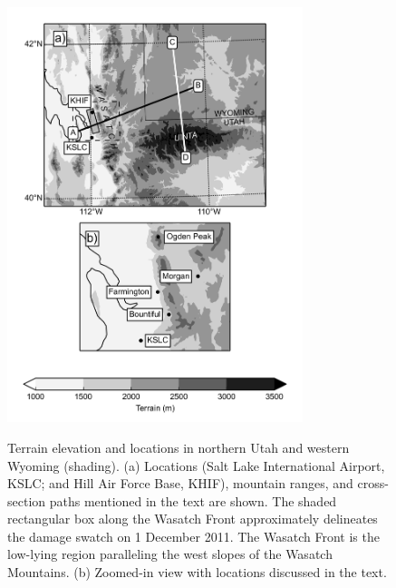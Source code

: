 \documentclass[pdftex,12pt]{article}
\begin{document}
\begin{figure}[t]
\centering
\noindent\includegraphics[width=0.77\textwidth]{map2}\\
\caption{Terrain elevation and locations in northern Utah and western Wyoming (shading). (a) Locations (Salt Lake International Airport, KSLC; and Hill Air Force Base, KHIF), mountain ranges, and cross-section paths mentioned in the text are shown.  The shaded rectangular box along the Wasatch Front approximately delineates the damage swatch on 1 December 2011. The Wasatch Front is the low-lying region paralleling the west slopes of the Wasatch Mountains. (b) Zoomed-in view with locations discussed in the text.}
\label{fig:wasatchmap}
\end{figure}
\end{document}
